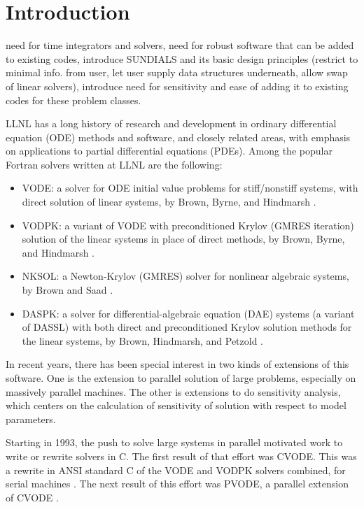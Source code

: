 \section{Introduction}

{\sf need for time integrators and solvers, need for robust
software that can be added to existing codes, introduce SUNDIALS
and its basic design principles (restrict to minimal info. from
user, let user supply data structures underneath, allow swap of
linear solvers), introduce need for sensitivity and ease of adding
it to existing codes for these problem classes. }

LLNL has a long history of research and development in ordinary
differential equation (ODE) methods and software, and closely related
areas, with emphasis on applications to partial differential equations
(PDEs).  Among the popular Fortran solvers written at LLNL are the
following:
\vspace*{-.19in}
\begin{itemize}

\item VODE: a solver for ODE initial value problems for stiff/nonstiff
systems, with direct solution of linear systems, by Brown, Byrne, and
Hindmarsh \cite{BBH:89}.

\item VODPK: a variant of VODE with preconditioned Krylov (GMRES
iteration) solution of the linear systems in place of direct methods,
by Brown, Byrne, and Hindmarsh \cite{Byr:92}.

\item NKSOL: a Newton-Krylov (GMRES) solver for nonlinear algebraic
systems, by Brown and Saad \cite{BrSa:90}.

\item DASPK: a solver for differential-algebraic equation (DAE)
systems (a variant of DASSL) with both direct and preconditioned
Krylov solution methods for the linear systems, by Brown, Hindmarsh,
and Petzold \cite{BHP:94}.

\end{itemize}

In recent years, there has been special interest in two kinds of
extensions of this software.  One is the extension to parallel
solution of large problems, especially on massively parallel machines.
The other is extensions to do sensitivity analysis, which centers
on the calculation of sensitivity of solution with respect to model
parameters.

Starting in 1993, the push to solve large systems in parallel
motivated work to write or rewrite solvers in C.  The first result of
that effort was CVODE.  This was a rewrite in ANSI standard C of the
VODE and VODPK solvers combined, for serial machines
\cite{CoHi:94,CoHi:96}.  The next result of this effort was PVODE, a
parallel extension of CVODE \cite{ByHi:98,ByHi:99}.

